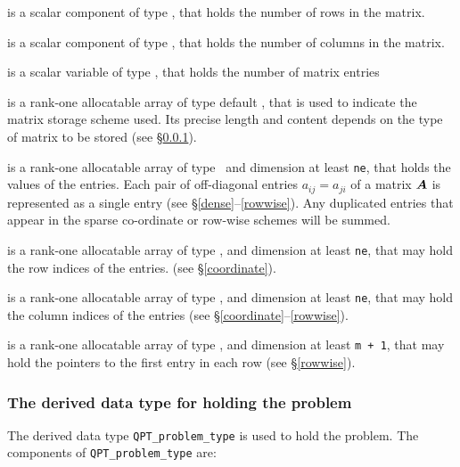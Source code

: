 \documentclass{galahad}
\begin{document}
\begin{description}

 is a scalar component of type \integer, 
that holds the number of rows in the matrix. 
 
 is a scalar component of type \integer, 
that holds the number of columns in the matrix. 
 
 is a scalar variable of type \integer, that
holds the number of matrix entries

 is a rank-one allocatable array of type default \character, that
is used to indicate the matrix storage scheme used. Its precise length and
content depends on the type of matrix to be stored (see \S\ref{typeprob}).

 is a rank-one allocatable array of type \realdp\, 
and dimension at least {\tt ne}, that holds the values of the entries. 
Each pair of off-diagonal entries $a_{ij} = a_{ji}$ of a matrix ${\bm{A}}$ 
is represented as a single entry 
(see \S\ref{dense}--\ref{rowwise}).
Any duplicated entries that appear in the sparse 
co-ordinate or row-wise schemes will be summed. 

 is a rank-one allocatable array of type \integer, 
and dimension at least {\tt ne}, that may hold the row indices of the entries. 
(see \S\ref{coordinate}).

 is a rank-one allocatable array of type \integer, 
and dimension at least {\tt ne}, that may hold the column indices of the entries
(see \S\ref{coordinate}--\ref{rowwise}).

 is a rank-one allocatable array of type \integer, 
and dimension at least {\tt m + 1}, that may hold the pointers to
the first entry in each row (see \S\ref{rowwise}).

\end{description}


\subsubsection{The derived data type for holding the problem}\label{typeprob}
The derived data type {\tt QPT\_problem\_type} is used to hold 
the problem. The components of 
{\tt QPT\_problem\_type} 
are:
\end{document}
